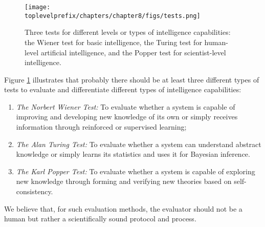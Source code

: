 \documentclass[../../book-main.tex]{subfiles}
\begin{document}
\begin{figure}[t]
    \centering
    \texttt{[image: \\toplevelprefix/chapters/chapter8/figs/tests.png]}
    \caption{Three tests for different levels or types of intelligence capabilities: the Wiener test for basic intelligence, the Turing test for human-level artificial intelligence, and the Popper test for scientist-level intelligence.}
    \label{fig:three-tests}
\end{figure}

Figure \ref{fig:three-tests} illustrates that probably there should be at least three different types of tests to evaluate and differentiate different types of intelligence capabilities:
\begin{enumerate}
    \item {\em The Norbert Wiener Test:} To evaluate whether a system is capable of improving and developing new knowledge of its own or simply receives information through reinforced or supervised learning;
    \item {\em The Alan Turing Test:} To evaluate whether a system can understand abstract knowledge or simply learns its statistics and uses it for Bayesian inference.
    \item {\em The Karl Popper Test:} To evaluate whether a system is capable of exploring new knowledge through forming and verifying new theories based on self-consistency.
\end{enumerate}
We believe that, for such evaluation methods, the evaluator should not be a human but rather a scientifically sound protocol and process.
\end{document}
